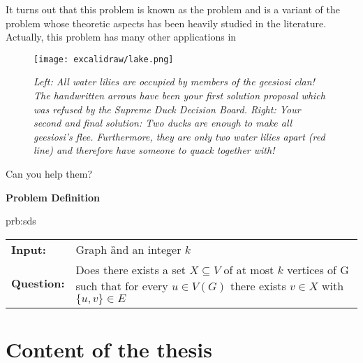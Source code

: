 It turns out that this problem is known as the \sdom problem and is a variant of the \dom problem whose theoretic aspects has been heavily studied in the literature. Actually, this problem has many other applications in 



\begin{figure}
    \centering
    \texttt{[image: excalidraw/lake.png]}
    \caption[Introductions: Merganser Lake. Own Drawing. Embedded icons under public domain from {\href{https://creazilla.com/}{https://creazilla.com/}}]{\textit{Left: All water lilies are occupied by members of the \textit{geesiosi} clan! The handwritten arrows have been your first solution proposal which was refused by the \textit{Supreme Duck Decision Board}.
    Right: Your second and final solution: Two ducks are enough to make all \textit{geesiosi}'s flee. Furthermore, they are only two water lilies apart (red line) and therefore have someone to quack together with!}}
    \label{fig:duck-lake}
\end{figure}

Can you help them? 


\textbf{Problem Definition}

\begin{prb}{prb:sds}
    
    \begin{tabularx}{0.8\textwidth}{>{\hsize=0.35\hsize}X>{\hsize=0.8\hsize}X}
        \textbf{Input:} & Graph \G and an integer $k$\\
        \textbf{Question:} & Does there exists a set $X \subseteq V$ of at most $k$ vertices of G such that for every $u \in V(G)$ there exists $v \in X$ with $\{u,v\} \in E$ \\
    \end{tabularx}
        
\end{prb}



\section{Content of the thesis}

